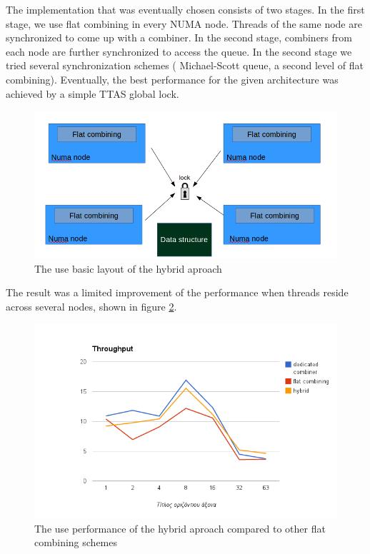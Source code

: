 The implementation that was eventually chosen  consists of two stages. In the first stage, we use flat combining in every NUMA node. Threads of the same node are synchronized to come up with a combiner. In the second stage, combiners from each node are further synchronized to access the queue. In the second stage we tried several synchronization schemes ( Michael-Scott queue, a second level of flat combining). Eventually, the best performance for the given architecture was achieved by a simple TTAS global lock.

\begin{figure}
 \centering
  \includegraphics[scale=0.7]{queue_fc_hybrid_basic.png}
\caption{The use basic layout of the hybrid aproach}
\label{queue_fc_hybrid_basic}
\end{figure}

The result was a limited improvement of the performance when threads reside across several nodes, shown in figure \ref{queue_fc_hybrid_perf}.

 
\begin{figure}
 \centering
  \includegraphics[scale=0.7]{queue_fc_hybrid_perf.png}
\caption{The use performance of the hybrid aproach compared to other flat combining schemes}
\label{queue_fc_hybrid_perf}
\end{figure}

